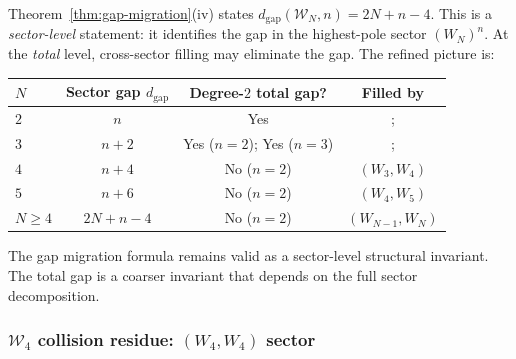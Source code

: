 \begin{remark}%
\label{rem:gap-migration-refined}%
%
Theorem~\ref{thm:gap-migration}(iv) states
$d_{\mathrm{gap}}(\mathcal{W}_N, n) = 2N + n - 4$.
This is a \emph{sector-level} statement: it identifies
the gap in the highest-pole sector $(W_N)^n$. At the
\emph{total} level, cross-sector filling may eliminate
the gap. The refined picture is:
\begin{center}
\small
\renewcommand{\arraystretch}{1.3}
\begin{tabular}{lccc}
\toprule
$N$ & \textbf{Sector gap} $d_{\mathrm{gap}}$
 & \textbf{Degree-$2$ total gap?}
 & \textbf{Filled by} \\
\midrule
$2$ & $n$ & Yes &; \\
$3$ & $n + 2$ & Yes ($n = 2$);
 Yes ($n = 3$) &; \\
$4$ & $n + 4$ & No ($n = 2$) & $(W_3, W_4)$ \\
$5$ & $n + 6$ & No ($n = 2$) & $(W_4, W_5)$ \\
$N \ge 4$ & $2N + n - 4$ & No ($n = 2$) & $(W_{N-1}, W_N)$ \\
\bottomrule
\end{tabular}
\end{center}
The gap migration formula remains valid as a
sector-level structural invariant. The total gap
is a coarser invariant that depends on the full
sector decomposition.
\end{remark}

\subsubsection{$\mathcal{W}_4$ collision residue:
$(W_4, W_4)$ sector}

